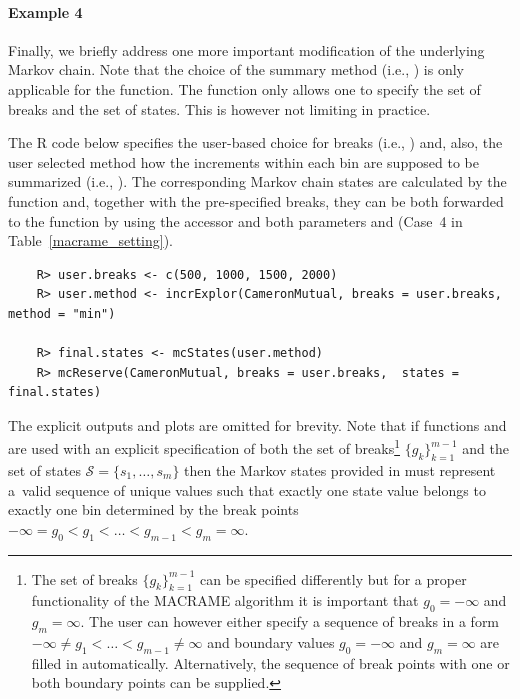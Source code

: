 \vspace{-10pt}\paragraph{Example 4} Finally, we briefly address one more important  modification of the underlying Markov chain. Note that the choice of the summary method (i.e., ) is only applicable for the  function. The  function only allows one to specify the set of breaks and the set of  states. This is however not limiting in practice.

The R code below specifies the user-based choice for breaks (i.e., ) and, also, the user selected method how the increments within each bin are supposed to be summarized (i.e., ). The corresponding Markov chain states are calculated by the  function and, together with the pre-specified breaks, they can be both forwarded to the  function by using the  accessor and both parameters  and  (Case~4 in Table~\ref{macrame_setting}).
\begin{verbatim}
    R> user.breaks <- c(500, 1000, 1500, 2000)
    R> user.method <- incrExplor(CameronMutual, breaks = user.breaks, method = "min")

    R> final.states <- mcStates(user.method)
    R> mcReserve(CameronMutual, breaks = user.breaks,  states = final.states)
\end{verbatim}
 The explicit outputs and plots are omitted for brevity. Note that if functions  and  are used with an explicit specification of both the set of breaks\footnote{The set of breaks $\{g_k\}_{k = 1}^{m - 1}$ can be specified differently but for a proper functionality of the MACRAME algorithm it is important that $g_0 = -\infty$ and $g_m = \infty$. The user can however either specify a sequence of breaks in a form $-\infty \neq g_1 < \dots < g_{m - 1} \neq \infty$ and boundary values $g_0 = -\infty$ and $g_m = \infty$ are filled in automatically. Alternatively, the sequence of break points with one or both boundary points can be supplied.}
$\{g_k\}_{k = 1}^{m - 1}$ and  the set of states $\mathcal{S} = \{s_1, \dots, s_m\}$ then the Markov states provided in  must represent a~valid sequence of unique values such that exactly one state value belongs to exactly one bin determined by the break points $-\infty = g_0 < g_1 < \dots < g_{m - 1} < g_m = \infty$. 

